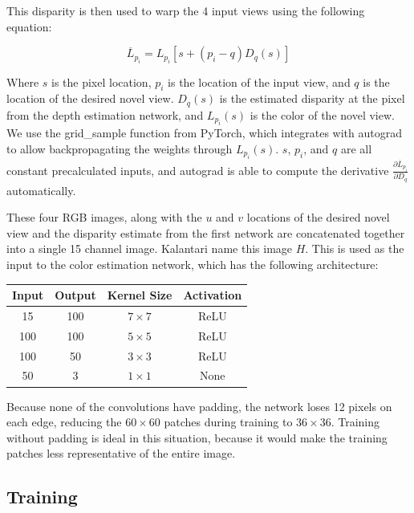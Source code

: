 \documentclass[10pt,twocolumn,letterpaper]{article}
\begin{document}
This disparity is then used to warp the 4 input views using the following equation:

$$
\overline{L}_{p_i} = L_{p_i} \left[ s + \left(p_i - q\right) D_q(s) \right]
$$

Where $s$ is the pixel location, $p_i$ is the location of the input view, and $q$ is the location of the
desired novel view. $D_q(s)$ is the estimated disparity at the pixel from the depth estimation network,
and $L_{p_i}(s)$ is the color of the novel view. We use the grid\_sample function from PyTorch, which integrates
with autograd to allow backpropagating the weights through $L_{p_i}(s)$. $s$, $p_i$, and $q$ are all 
constant precalculated inputs, and autograd is able to compute the derivative 
$\frac{\partial \overline{L}_{p_i}}{\partial D_q}$ automatically. 

These four RGB images, along with the $u$ and $v$ 
locations of the desired novel view and the disparity estimate from the first network are concatenated
together into a single 15 channel image. Kalantari \etal name this image $H$. This is used as the input to the color estimation network, which
has the following architecture:

\begin{center}
\begin{tabular}{|c c c c|}
    \hline
    Input & Output & Kernel Size & Activation \\
    \hline
    15 & 100 & $7 \times 7$ & ReLU \\
    100 & 100 & $5 \times 5$ & ReLU \\
    100 & 50 & $3 \times 3$ & ReLU \\
    50 & 3 & $1 \times 1$ & None \\
    \hline
\end{tabular}
\end{center}

Because none of the convolutions have padding, the network loses 12 pixels on each edge, reducing
the $60 \times 60$ patches during training to $36 \times 36$. Training without padding is ideal in this situation, 
because it would make the training patches less representative of the entire image.

\subsection{Training}
\end{document}
